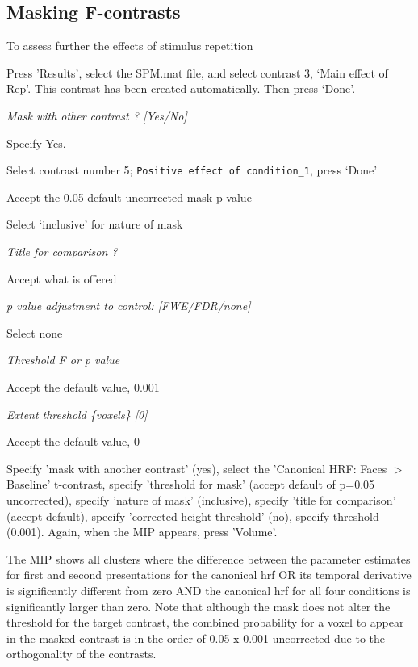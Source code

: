 \subsection{Masking F-contrasts}

To assess further the effects of stimulus repetition

\bi
\item{Press 'Results', select the SPM.mat file, and select contrast 3, `Main effect of Rep'. This contrast has been created automatically. Then press `Done'.}
\item{\em Mask with other contrast ? [Yes/No]}
\item{Specify Yes.}
\item{Select contrast number 5; \verb!Positive effect of condition_1!, press `Done'}
\item{Accept the 0.05 default uncorrected mask p-value}
\item{Select `inclusive' for nature of mask}
\item{\em Title for comparison ?}
\item{Accept what is offered}
\item{\em p value adjustment to control: [FWE/FDR/none]}
\item{Select none}
\item{\em Threshold F or p value}
\item{Accept the default value, 0.001}
\item{\em Extent threshold \{voxels\} [0]}
\item{Accept the default value, 0}
\ei

Specify 'mask with another contrast' (yes), select the 'Canonical HRF: Faces $>$ Baseline' t-contrast, specify 'threshold for mask' (accept default of p=0.05 uncorrected), specify 'nature of mask' (inclusive), specify 'title for comparison' (accept default), specify 'corrected height threshold' (no), specify threshold (0.001). Again, when the MIP appears, press 'Volume'.

The MIP shows all clusters where the difference between the parameter estimates for first and second presentations for the canonical hrf OR its temporal derivative is significantly different from zero AND the canonical hrf for all four conditions is significantly larger than zero. Note that although the mask does not alter the threshold for the target contrast, the combined probability for a voxel to appear in the masked contrast is in the order of 0.05 x 0.001 uncorrected due to the orthogonality of the contrasts. 


